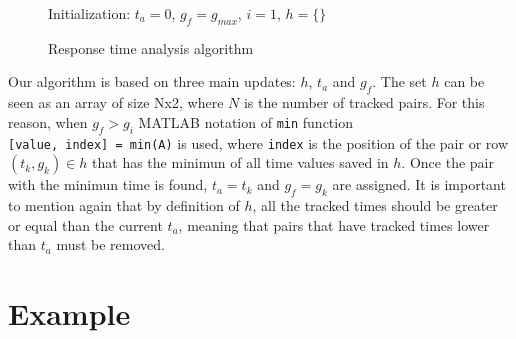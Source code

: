 \documentclass[
  12pt,
  a4paperpaper,
]{report}
\begin{document}
\begin{figure}[ht]
\centering
\begin{minipage}{.7\linewidth}
    \begin{algorithm}[H]
        \DontPrintSemicolon
        \SetAlgoLined
        \Input{$\tau$}
        \BlankLine
        Initialization: $t_a = 0$, $g_f = g_{max}$, $i=1$, $h = \{\}$ \\
        \caption{Response time analysis algorithm }
        \label{alg:full}
    \end{algorithm} 
  \end{minipage}
\end{figure}

Our algorithm is based on three main updates: \(h\), \(t_a\) and
\(g_f\). The set \(h\) can be seen as an array of size Nx2, where \(N\)
is the number of tracked pairs. For this reason, when \(g_f > g_i\) MATLAB notation of \texttt{min} function
\texttt{{[}value,\ index{]}\ =\ min(A)} is used, where \texttt{index} is the
position of the pair or row \((t_k, g_k) \in h\) that has the minimun of
all time values saved in \(h\). Once the pair with the minimun
time is found, \(t_a = t_k\) and \(g_f = g_k\) are assigned. It is important to
mention again that by definition of \(h\), all the tracked times should
be greater or equal than the current \(t_a\), meaning that pairs that
have tracked times lower than \(t_a\) must be removed.

\hypertarget{example}{%
\section{Example}\label{example}}
\end{document}

